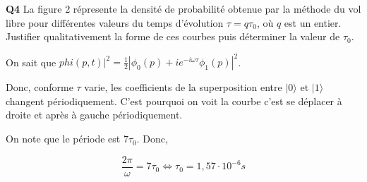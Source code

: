 \documentclass[french]{article}
\begin{document}
	\begin{tcolorbox}[colback=gray!5!white,colframe=gray!75!black]
		\textbf{\large{Q4}} La figure 2 répresente la densité de probabilité obtenue par la méthode du vol libre pour différentes valeurs du temps d'évolution $\tau = q \tau_0$, où $q$ est un entier. Justifier qualitativement la forme de ces courbes puis déterminer la valeur de $\tau_0$.
	\end{tcolorbox}

	On sait que $phi(p, t)|^2 = \frac{1}{2}\left|\phi_0(p) + ie^{-i\omega\tau}\phi_1(p)\right|^2$.
	
	Donc, conforme $\tau$ varie, les coefficients de la superposition entre $|0\rangle$ et $|1\rangle$ changent périodiquement. C'est pourquoi on voit la courbe c'est se déplacer à droite et après à gauche périodiquement.
	
	On note que le période est $7\tau_0$. Donc,
	
	\[\frac{2\pi}{\omega} = 7\tau_0 \iff \tau_0 = 1,57 \cdot 10^{-6}s\] 
	
\end{document}

